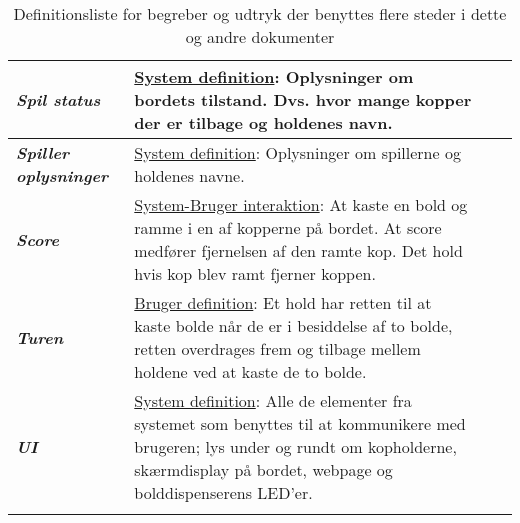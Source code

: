 \documentclass[Kravspecifikation/Kravspec_Main.tex]{subfiles}
\begin{document}
\begin{longtable}{|>{\centering\arraybackslash}m{3cm}|>{\RaggedRight\arraybackslash}m{10cm}| p{} | p{}|}
        \hline
        \textit{\textbf{Spil status}} & \underline{System definition}:
        Oplysninger om bordets tilstand. Dvs. hvor mange kopper der er tilbage og holdenes navn. \\
        \hline
        \textit{\textbf{Spiller oplysninger}} & \underline{System definition}:
        Oplysninger om spillerne og holdenes navne. \\
        \hline
        \textit{\textbf{Score}} & \underline{System-Bruger interaktion}:
        At kaste en bold og ramme i en af kopperne på bordet. At score medfører fjernelsen af den ramte kop. Det hold hvis kop blev ramt fjerner koppen. \\
        \hline
        \textit{\textbf{Turen}} & \underline{Bruger definition}:
        Et hold har retten til at kaste bolde når de er i besiddelse af to bolde, retten overdrages frem og tilbage mellem holdene ved at kaste de to bolde. \\
        \hline
        
        \textit{\textbf{UI}} & \underline{System definition}:
        Alle de elementer fra systemet som benyttes til at kommunikere med brugeren; lys under og rundt om kopholderne, skærmdisplay på bordet, webpage og bolddispenserens LED'er.\\
        \hline
    \caption{Definitionsliste for begreber og udtryk der benyttes flere steder i dette og andre dokumenter}
    \label{tab:def_liste}
    \end{longtable}
\end{document}
